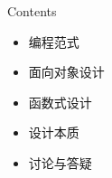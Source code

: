 \begin{frame}
  \titlepage
\end{frame}

\begin{frame}{Contents}
    \begin{itemize}
    \item \alert{编程范式}
    \item \alert{面向对象设计} 
    \item \alert{函数式设计} 
    \item \alert{设计本质} 
    \item \alert{讨论与答疑}
    \end{itemize}
\end{frame}